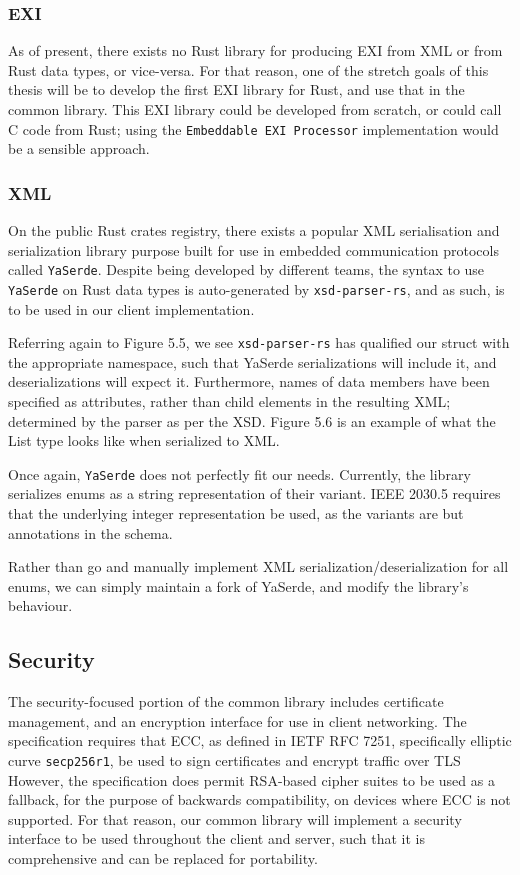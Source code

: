 \subsubsection{EXI}
As of present, there exists no Rust library for producing EXI from XML or from Rust data types, or vice-versa. For that reason, one of the stretch goals of this thesis will be to develop the first EXI library for Rust, and use that in the common library.
This EXI library could be developed from scratch, or could call C code from Rust; using the \texttt{Embeddable EXI Processor} implementation would be a sensible approach.

\subsubsection{XML}

On the public Rust crates registry, there exists a popular XML serialisation and serialization library purpose built for use in embedded communication protocols called \texttt{YaSerde}.
Despite being developed by different teams, the syntax to use \texttt{YaSerde} on Rust data types is auto-generated by \texttt{xsd-parser-rs}, and as such, is to be used in our client implementation.

Referring again to Figure 5.5, we see \texttt{xsd-parser-rs} has qualified our struct with the appropriate namespace, such that YaSerde serializations will include it, and deserializations will expect it.
Furthermore, names of data members have been specified as attributes, rather than child elements in the resulting XML; determined by the parser as per the XSD.
Figure 5.6 is an example of what the List type looks like when serialized to XML.

Once again, \texttt{YaSerde} does not perfectly fit our needs. Currently, the library serializes enums as a string representation of their variant. IEEE 2030.5 requires that the underlying integer representation be used, as the variants are but annotations in the schema.

Rather than go and manually implement XML serialization/deserialization for all enums, we can simply maintain a fork of YaSerde, and modify the library's behaviour.


\subsection{Security}
The security-focused portion of the common library includes certificate management, and an encryption interface for use in client networking.
The specification requires that ECC, as defined in IETF RFC 7251, specifically elliptic curve \texttt{secp256r1}, be used to sign certificates and encrypt traffic over TLS 
However, the specification does permit RSA-based cipher suites to be used as a fallback, for the purpose of backwards compatibility, on devices where ECC is not supported.
For that reason, our common library will implement a security interface to be used throughout the client and server, such that it is comprehensive and can be replaced for portability.

